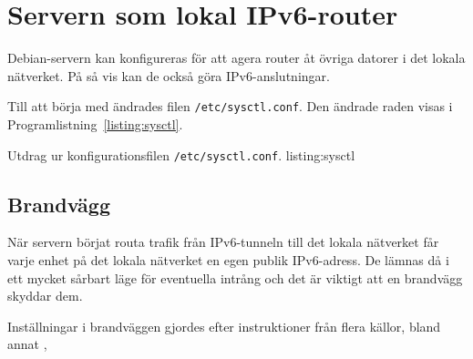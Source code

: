 %
%
%


\section{Servern som lokal IPv6-router}
Debian-servern kan konfigureras för att agera router åt övriga datorer i det
lokala nätverket. På så vis kan de också göra IPv6-anslutningar.

Till att börja med ändrades filen \texttt{/etc/sysctl.conf}. Den ändrade
raden visas i Programlistning~\ref{listing:sysctl}.

             {Utdrag ur konfigurationsfilen \texttt{/etc/sysctl.conf}.}
             {listing:sysctl}

\subsection{Brandvägg}
När servern börjat routa trafik från IPv6-tunneln till det lokala
nätverket får varje enhet på det lokala nätverket en egen publik IPv6-adress.
De lämnas då i ett mycket sårbart läge för eventuella intrång och det
är viktigt att en brandvägg skyddar dem. 

Inställningar i brandväggen gjordes efter instruktioner från flera källor, 
bland annat \cite{ipv6:settingup}, \cite{debian:networkconfig}




